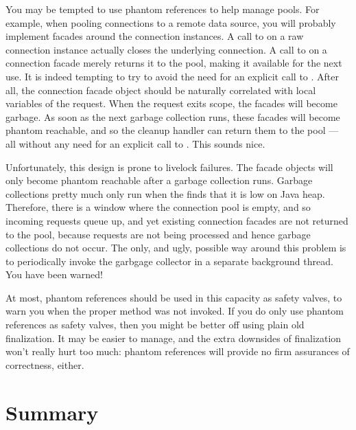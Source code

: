 You may be tempted to use phantom references to help manage pools. For example,
when pooling connections to a remote data source, you will probably implement
facades around the connection instances. A call to  on a raw
connection instance actually closes the underlying connection. A call to
 on a connection facade merely returns it to the pool, making it
available for the next use. It is indeed tempting to try to avoid the need for
an explicit call to . After all, the connection facade object should
be naturally correlated with local variables of the request. When the request
exits scope, the facades will become garbage. As soon as the next garbage
collection runs, these facades will become phantom reachable, and so the cleanup
handler can return them to the pool --- all without any need for an explicit
call to . This sounds nice.

Unfortunately, this design is prone to livelock failures. The
facade objects will only become phantom reachable after a garbage collection
runs. Garbage collections pretty much only run when the \jre finds that it is
low on Java heap. Therefore, there is a window where the connection pool is
empty, and so incoming requests queue up, and yet existing connection facades
are not returned to the pool, because requests are not being processed
and hence garbage collections do not occur. The only, and ugly, possible way
around this problem is to periodically invoke the garbgage collector in a
separate background thread. You have been warned!

At most, phantom references should be used in this capacity as safety valves, to
warn you when the proper  method was not invoked. If you do only use
phantom references as safety valves, then you might be better off using plain
old finalization. It may be easier to manage, and the extra downsides of
finalization won't really hurt too much: phantom references will provide no firm
assurances of correctness, either.


\section{Summary}

